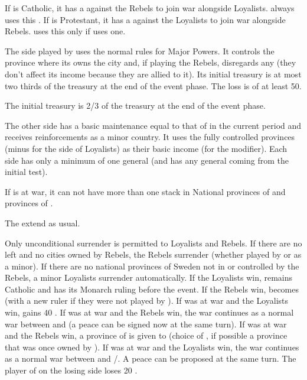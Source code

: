 \phdipl
\aparag If \POLpol is Catholic, it has a \CB against the Rebels to join war
alongside Loyalists. \POLmin always uses this \CB.
\aparag If \DANdan is Protestant, it has a \CB against the Loyalists to join
war alongside Rebels. \DANMin uses this \CB only if \POL uses one.


\phadm
\aparag The side played by \SUE uses the normal rules for Major Powers. It
controls the province where its owns the city and, if playing the Rebels,
disregards any \REVOLT (they don't affect its income because they are allied
to it).
\bparag Its initial treasury is at most two thirds of the treasury at the end
of the event phase. The loss is of at least 50\ducats.
\begin{oldcompta}
  \bparag The initial treasury is 2/3 of the treasury at the end of the event
  phase.
\end{oldcompta}
\aparag The other side has a basic maintenance equal to that of \SUE in the
current period and receives reinforcements as a minor country.  It uses the
fully controlled provinces (minus \REVOLT for the side of Loyalists) as their
basic income (for the modifier).
\aparag Each side has only a minimum of one general (and has any general
coming from the initial test).

\phmil
\aparag If \POL is at war, it can not have more than one stack in National
provinces of \paysmajeurSuede and provinces of \regionNorvege.

\phinter
\aparag The \REVOLT extend as usual.

\phpaix
\aparag Only unconditional surrender is permitted to Loyalists and Rebels. If
there are no \REVOLT left and no cities owned by Rebels, the Rebels surrender
(whether played by \SUE or as a minor).  If there are no national provinces of
Sweden not in \REVOLT or controlled by the Rebels, a minor Loyalists surrender
automatically.
\bparag If the Loyalists win, \SUE remains Catholic and has its Monarch ruling
before the event.
\bparag If the Rebels win, \SUE becomes \PROTTOL (with a new ruler if they
were not played by \SUE).
\bparag If \POL was at war and the Loyalists win, \POL gains 40 \PV.
\bparag If \POL was at war and the Rebels win, the war continues as a normal
war between \POL and \SUE (a peace can be signed now at the same turn).
\bparag If \DANdan was at war and the Rebels win, a province of \SUE is given
to \DANdan (choice of \SUE, if possible a province that was once owned by
\DANdan).
\bparag If \DANdan was at war and the Loyalists win, the war continues as a
normal war between \DANdan and \POL/\SUE.  A peace can be proposed at the same
turn.
\aparag The player of \SUE on the losing side loses 20 \PV.



